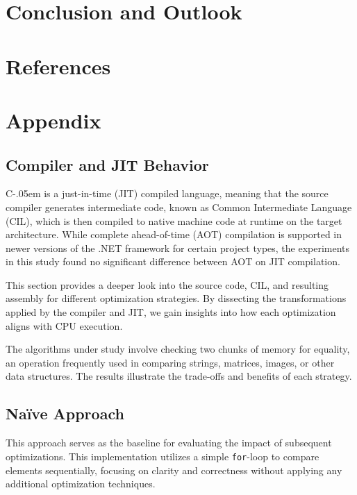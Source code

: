 \documentclass{article}
\newcommand{\Csharp}{%
  {\settoheight{\dimen0}{C}C\kern-.05em \resizebox{!}{\dimen0}{\raisebox{\depth}{\# }}}}
\begin{document}
\section{Conclusion and Outlook}

\section{References}

\section{Appendix}

\subsection{Compiler and JIT Behavior}

\Csharp is a just-in-time (JIT) compiled language, meaning that the source compiler generates intermediate code, known as Common Intermediate Language (CIL), which is then compiled to native machine code at runtime on the target architecture. While complete ahead-of-time (AOT) compilation is supported in newer versions of the .NET framework for certain project types, the experiments in this study found no significant difference between AOT on JIT compilation.

This section provides a deeper look into the source code, CIL, and resulting assembly for different optimization strategies. By dissecting the transformations applied by the compiler and JIT, we gain insights into how each optimization aligns with CPU execution.

The algorithms under study involve checking two chunks of memory for equality, an operation frequently used in comparing strings, matrices, images, or other data structures. The results illustrate the trade-offs and benefits of each strategy.

\subsection{Naïve Approach}

This approach serves as the baseline for evaluating the impact of subsequent optimizations. This implementation utilizes a simple \texttt{for}-loop to compare elements sequentially, focusing on clarity and correctness without applying any additional optimization techniques. 
\end{document}
